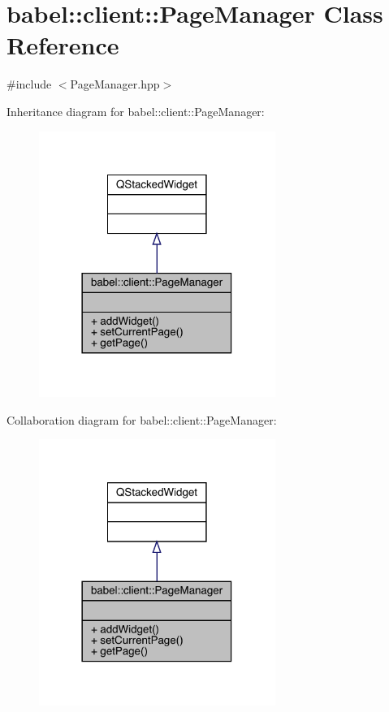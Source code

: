 \hypertarget{classbabel_1_1client_1_1_page_manager}{}\section{babel\+:\+:client\+:\+:Page\+Manager Class Reference}
\label{classbabel_1_1client_1_1_page_manager}


{\ttfamily \#include $<$Page\+Manager.\+hpp$>$}



Inheritance diagram for babel\+:\+:client\+:\+:Page\+Manager\+:\nopagebreak
\begin{figure}[H]
\begin{center}
\leavevmode
\includegraphics[width=218pt]{classbabel_1_1client_1_1_page_manager__inherit__graph}
\end{center}
\end{figure}


Collaboration diagram for babel\+:\+:client\+:\+:Page\+Manager\+:\nopagebreak
\begin{figure}[H]
\begin{center}
\leavevmode
\includegraphics[width=218pt]{classbabel_1_1client_1_1_page_manager__coll__graph}
\end{center}
\end{figure}
